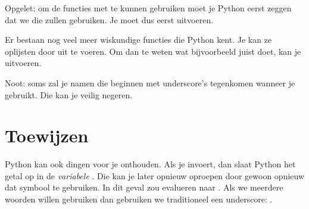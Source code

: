   Opgelet: om de functies met  te kunnen gebruiken moet je Python
  eerst zeggen dat we die zullen gebruiken. Je moet dus eerst 
  uitvoeren.

  Er bestaan nog veel meer wiskundige functies die Python kent. Je kan ze
  oplijsten door  uit te voeren. Om dan te weten wat bijvoorbeeld
   juist doet, kan je  uitvoeren.

  Noot: soms zal je namen die beginnen met underscore's tegenkomen wanneer je
   gebruikt. Die kan je veilig negeren.
\section{Toewijzen}
  Python kan ook dingen voor je onthouden. Als je  invoert,
  dan slaat Python het getal  op in de \emph{variabele} .
  Die kan je later opnieuw oproepen door gewoon opnieuw dat symbool te
  gebruiken. In dit geval zou  evalueren naar .
  Als we meerdere woorden willen gebruiken dan gebruiken we traditioneel een
  underscore: .

